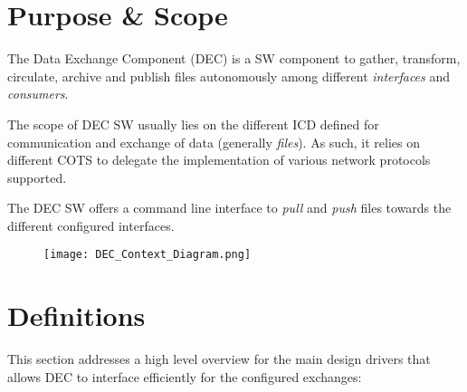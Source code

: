\documentclass[dec_sum_main.tex]{subfiles}
\begin{document}
\section{Purpose \& Scope}
The Data Exchange Component (DEC) is a SW component to gather, transform, circulate, archive and publish files autonomously among different \textit{interfaces} and \textit{consumers}. \newline
\par
\noindent
The scope of DEC SW usually lies on the different ICD defined for communication and exchange of data (generally \textit{files}). As such, it relies on different COTS to delegate the implementation of various network protocols supported.\newline
\par
\noindent
The DEC SW offers a command line interface to \textit{pull} and \textit{push} files towards the different configured interfaces.

\begin{figure}[hbt!]
	\centering
	\texttt{[image: DEC\_Context\_Diagram.png]}
\end{figure}

\section{Definitions}
This section addresses a high level overview for the main design drivers that allows DEC to interface efficiently for the configured exchanges:
\end{document}
